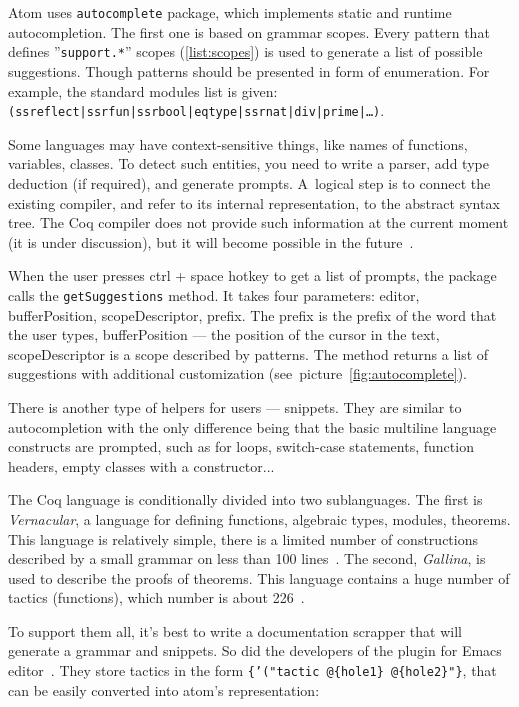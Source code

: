 Atom uses \texttt{autocomplete} package, which implements static and runtime autocompletion. The first one is based on grammar scopes. Every pattern that defines ''\texttt{support.*}'' scopes (\ref{list:scopes}) is used to generate a list of possible suggestions. Though patterns should be presented in form of enumeration. For example, the standard modules list is given: \texttt{(ssreflect|ssrfun|ssrbool|eqtype|ssrnat|div|prime|…)}.

Some languages may have context-sensitive things, like names of functions, variables, classes. To detect such entities, you need to write a parser, add type deduction (if required), and generate prompts. A~logical step is to connect the existing compiler, and refer to its internal representation, to the abstract syntax tree. The Coq compiler does not provide such information at the current moment (it is under discussion), but it will become possible in the future~\autocite{coq-autocompletion}.

When the user presses ctrl + space hotkey to get a list of prompts, the package calls the \texttt{getSuggestions} method. It takes four parameters: editor, bufferPosition, scopeDescriptor, prefix. The prefix is the prefix of the word that the user types, bufferPosition --- the position of the cursor in the text, scopeDescriptor is a scope described by patterns. The method returns a list of suggestions with additional customization (see~picture~\ref{fig:autocomplete}).

There is another type of helpers for users --- snippets. They are similar to autocompletion with the only difference being that the basic multiline language constructs are prompted, such as for loops, switch-case statements, function headers, empty classes with a constructor...

The Coq language is conditionally divided into two sublanguages. The first is {\em Vernacular}, a language for defining functions, algebraic types, modules, theorems. This language is relatively simple, there is a limited number of constructions described by a small grammar on less than 100 lines~\autocite{vernacular-grammar}. The second, {\em Gallina}, is used to describe the proofs of theorems. This language contains a huge number of tactics (functions), which number is about 226~\autocite{tactics-index}.

To support them all, it's best to write a documentation scrapper that will generate a grammar and snippets. So did the developers of the plugin for Emacs editor~\autocite{tactics-emacs}. They store tactics in the form \texttt{\{'("tactic~@\{hole1\}~@\{hole2\}"\}}, that can be easily converted into atom's representation:

